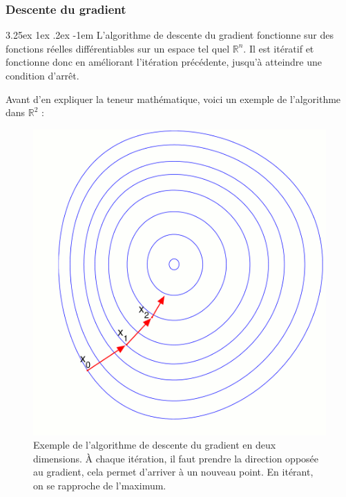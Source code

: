 \documentclass[a4paper, 11pt]{article}
\makeatletter
\renewcommand\paragraph{\@startsection{paragraph}{5}{\z@}%
  {3.25ex \@plus1ex \@minus.2ex}%
  {-1em}%
  {\normalfont\normalsize\bfseries}}
\makeatother
\begin{document}
\subsubsection{Descente du gradient}\label{section descente du gradient}
\paragraph{}
L'algorithme de descente du gradient fonctionne sur des fonctions réelles différentiables sur un espace tel quel $\mathbb{R}^n$. Il est itératif et fonctionne donc en améliorant l'itération précédente, jusqu'à atteindre une condition d'arrêt.

Avant d'en expliquer la teneur mathématique, voici un exemple de l'algorithme dans $\mathbb{R}^2$ :

\begin{figure}[H]
\centering
\includegraphics[scale=0.40]{images/descente_gradient_exemple}
\caption[]{Exemple de l'algorithme de descente du gradient en deux dimensions. À chaque itération, il faut prendre la direction opposée au gradient\footnotemark, cela permet d'arriver à un nouveau point. En itérant, on se rapproche de l'maximum. }
\end{figure}

\end{document}
